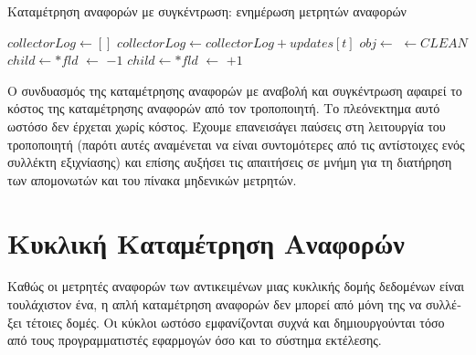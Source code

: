 \begin{greek}
\begin{algorithm}[H]
  \caption{Καταμέτρηση αναφορών με συγκέντρωση: ενημέρωση μετρητών αναφορών}
  \label{alg:refcnt_4}
  \begin{algorithmic}[1]
      \State {}
      \State {}
      \State {}
    \EndProcedure
    \Statex
      \State $collectorLog \gets []$
        \State $collectorLog \gets collectorLog + updates[t]$
      \EndFor
    \EndProcedure
    \Statex
        \State $obj \gets$ 
         
          \State {} $\gets CLEAN$
          \State {}
          \State {}
        \EndIf
      \EndFor
    \EndProcedure
    \Statex
       
        \State $child \gets *fld$
          \State {} $\gets$  $-1$
            \State {}
          \EndIf
        \EndIf
      \EndFor
    \EndProcedure
    \Statex
       
        \State $child \gets *fld$
          \State {} $\gets$  $+1$
        \EndIf
      \EndFor
    \EndProcedure
  \end{algorithmic}
\end{algorithm}  

Ο συνδυασμός της καταμέτρησης αναφορών με αναβολή και συγκέντρωση
αφαιρεί το κόστος της καταμέτρησης αναφορών από τον τροποποιητή.
Το πλεόνεκτημα αυτό ωστόσο δεν έρχεται χωρίς κόστος. Έχουμε
επανεισάγει παύσεις στη λειτουργία του τροποποιητή (παρότι
αυτές αναμένεται να είναι συντομότερες από τις αντίστοιχες ενός
συλλέκτη εξιχνίασης) και επίσης αυξήσει τις απαιτήσεις σε μνήμη
για τη διατήρηση των απομονωτών και του πίνακα μηδενικών μετρητών.

\section{Κυκλική Καταμέτρηση Αναφορών}
Καθώς οι μετρητές αναφορών των αντικειμένων μιας κυκλικής δομής
δεδομένων είναι τουλάχιστον ένα, η απλή καταμέτρηση αναφορών
δεν μπορεί από μόνη της να συλλέξει τέτοιες δομές. Οι κύκλοι
ωστόσο εμφανίζονται συχνά και δημιουργούνται τόσο από τους
προγραμματιστές εφαρμογών όσο και το σύστημα εκτέλεσης.


\end{greek}
